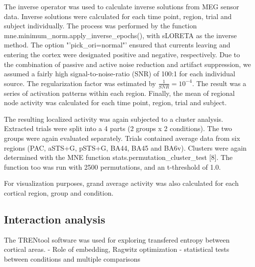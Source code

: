 The inverse operator was used to calculate inverse solutions from MEG sensor data.
Inverse solutions were calculated for each time point, region, trial and subject individually.
The process was performed by the function mne.minimum\_norm.apply\_inverse\_epochs(), with sLORETA as the inverse method.
The option "'pick\_ori=normal"' ensured that currents leaving and entering the cortex were designated positive and negative, respectively.
Due to the combination of passive and active noise reduction and artifact suppression, we assumed a fairly high signal-to-noise-ratio (SNR) of 100:1 for each individual source.
The regularization factor was estimated by $\frac{1}{SNR} = 10^{-4}$.
The result was a series of activation patterns within each region.
Finally, the mean of regional node activity was calculated for each time point, region, trial and subject.


The resulting localized activity was again subjected to a cluster analysis.
Extracted trials were split into a 4 parts (2 groups x 2 conditions).
The two groups were again evaluated separately.
Trials contained average data from six regions (PAC, aSTS+G, pSTS+G, BA44, BA45 and BA6v).
Clusters were again determined with the MNE function stats.permutation\_cluster\_test [8].
The function too was run with 2500 permutations, and an t-threshold of 1.0.

For visualization purposes, grand average activity was also calculated for each cortical region, group and condition.


\subsection{Interaction analysis}

The TRENtool software was used for exploring transfered entropy between cortical areas.
- Role of embedding, Ragwitz optimization
- statistical tests between conditions and multiple comparisons